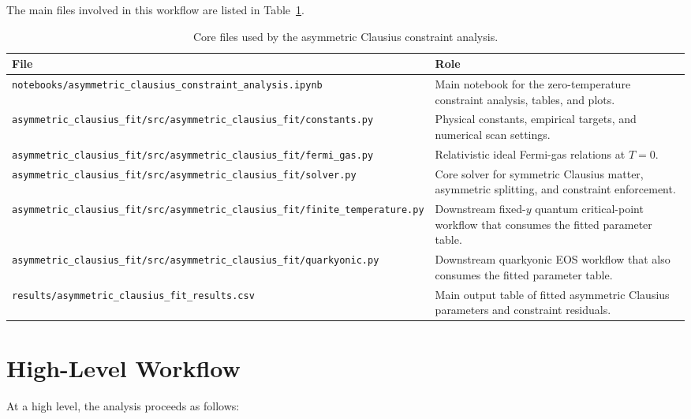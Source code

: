 \documentclass[11pt]{article}
\begin{document}
The main files involved in this workflow are listed in
Table~\ref{tab:files}.

\begin{table}[h]
\centering
\begin{tabular}{>{\raggedright\arraybackslash}p{} >{\raggedright\arraybackslash}p{}}
\toprule
File & Role \\
\midrule
\texttt{notebooks/asymmetric\_clausius\_constraint\_analysis.ipynb} & Main notebook for the zero-temperature constraint analysis, tables, and plots. \\
\texttt{asymmetric\_clausius\_fit/src/asymmetric\_clausius\_fit/constants.py} & Physical constants, empirical targets, and numerical scan settings. \\
\texttt{asymmetric\_clausius\_fit/src/asymmetric\_clausius\_fit/fermi\_gas.py} & Relativistic ideal Fermi-gas relations at $T=0$. \\
\texttt{asymmetric\_clausius\_fit/src/asymmetric\_clausius\_fit/solver.py} & Core solver for symmetric Clausius matter, asymmetric splitting, and constraint enforcement. \\
\texttt{asymmetric\_clausius\_fit/src/asymmetric\_clausius\_fit/finite\_temperature.py} & Downstream fixed-$y$ quantum critical-point workflow that consumes the fitted parameter table. \\
\texttt{asymmetric\_clausius\_fit/src/asymmetric\_clausius\_fit/quarkyonic.py} & Downstream quarkyonic EOS workflow that also consumes the fitted parameter table. \\
\texttt{results/asymmetric\_clausius\_fit\_results.csv} & Main output table of fitted asymmetric Clausius parameters and constraint residuals. \\
\bottomrule
\end{tabular}
\caption{Core files used by the asymmetric Clausius constraint analysis.}
\label{tab:files}
\end{table}

\section{High-Level Workflow}

At a high level, the analysis proceeds as follows:
\end{document}
